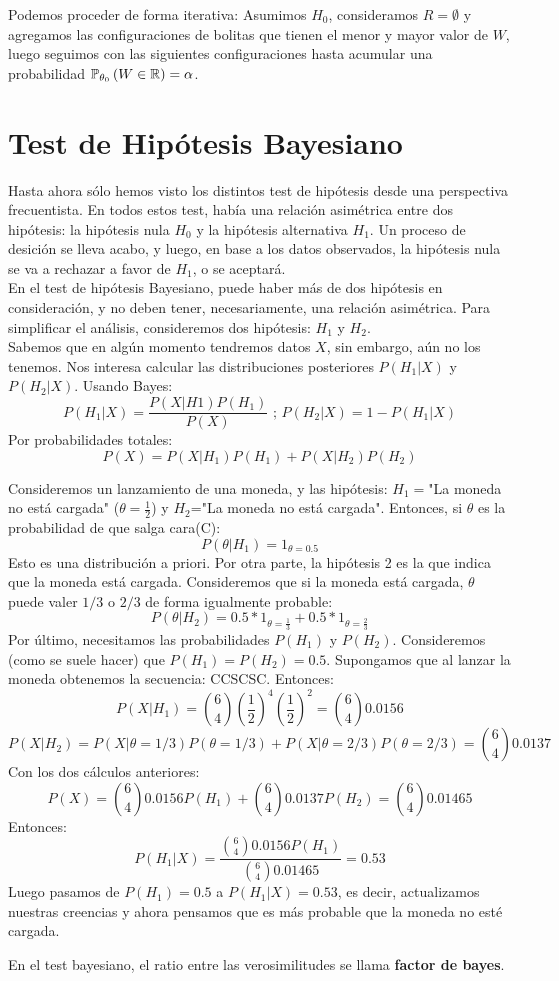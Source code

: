  \begin{remark}
 	Podemos proceder de forma iterativa: Asumimos $H_0$, consideramos $R=\emptyset$ y agregamos las configuraciones de bolitas que tienen el menor y mayor valor de $W$, luego seguimos con las siguientes configuraciones hasta acumular una probabilidad $\mathbb{P}_{\theta_0} \left(W\in{\mathbb R}\right) = \alpha$.
 \end{remark}
 
 \section{Test de Hipótesis Bayesiano}
 Hasta ahora sólo hemos visto los distintos test de hipótesis desde una perspectiva frecuentista. En todos estos test, había una relación asimétrica entre dos hipótesis: la hipótesis nula $H_0$ y la hipótesis alternativa $H_1$. Un proceso de desición se lleva acabo, y luego, en base a los datos observados, la hipótesis nula se va a rechazar a favor de $H_1$, o se aceptará. \\
 En el test de hipótesis Bayesiano, puede haber más de dos hipótesis en consideración, y no deben tener, necesariamente, una relación asimétrica.
 Para simplificar el análisis, consideremos dos hipótesis: $H_1$ y $H_2$.\\
 Sabemos que en algún momento tendremos datos $X$, sin embargo, aún no los tenemos. Nos interesa calcular las distribuciones posteriores $P(H_1|X)$ y $P(H_2|X)$. Usando Bayes: 
 $$
 P(H_1|X)=\dfrac{P(X|H1)P(H_1)}{P(X)} \text{ ; }
 P(H_2|X)=1-P(H_1|X)
 $$
Por probabilidades totales: 
$$
P(X)=P(X|H_1)P(H_1)+P(X|H_2)P(H_2)
$$
\begin{example}
    Consideremos un lanzamiento de una moneda, y las hipótesis: $H_1=$"La moneda no está cargada" ($\theta=\frac{1}{2}$) y $H_2$="La moneda no está cargada". Entonces, si $\theta$ es la probabilidad de que salga cara(C):
    $$
    P(\theta|H_1)=1_{\theta=0.5}
    $$
    Esto es una distribución a priori. Por otra parte, la hipótesis 2 es la que indica que la moneda está cargada. Consideremos que si la moneda está cargada, $\theta$ puede valer $1/3$ o $2/3$ de forma igualmente probable: 
     $$
    P(\theta|H_2)= 0.5 *1_{\theta=\frac{1}{3}} + 0.5* 1_{\theta=\frac{2}{3}}
    $$
    Por último, necesitamos las probabilidades $P(H_1)$ y $P(H_2)$. Consideremos (como se suele hacer) que $P(H_1)=P(H_2)=0.5$. Supongamos que al lanzar la moneda obtenemos la secuencia: CCSCSC. Entonces: 
    $$
    P(X|H_1)=  \binom{6}{4} (\dfrac{1}{2})^{4}(\dfrac{1}{2})^{2} =  \binom{6}{4} 0.0156 
    $$
    $$
    P(X|H_2) = P(X|\theta=1/3)P(\theta=1/3)+  P(X|\theta=2/3)P(\theta=2/3) =\binom{6}{4} 0.0137 
    $$
    Con los dos cálculos anteriores: 
    $$
    P(X)= \binom{6}{4} 0.0156 P(H_1) + \binom{6}{4} 0.0137 P(H_2) = \binom{6}{4} 0.01465
    $$
    Entonces: 
    $$
    P(H_1|X)=\dfrac{ \binom{6}{4} 0.0156 P(H_1)}{\binom{6}{4} 0.01465}  = 0.53
    $$
    Luego pasamos de $P(H_1)=0.5$ a $P(H_1|X)=0.53$, es decir, actualizamos nuestras creencias y ahora pensamos que es más probable que la moneda no esté cargada.
\end{example}
 
 En el test bayesiano, el ratio entre las verosimilitudes se llama \textbf{factor de bayes}.
